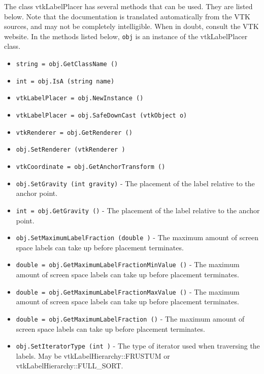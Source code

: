 The class vtkLabelPlacer has several methods that can be used.
  They are listed below.
Note that the documentation is translated automatically from the VTK sources,
and may not be completely intelligible.  When in doubt, consult the VTK website.
In the methods listed below, \verb|obj| is an instance of the vtkLabelPlacer class.
\begin{itemize}
\item  \verb|string = obj.GetClassName ()|

\item  \verb|int = obj.IsA (string name)|

\item  \verb|vtkLabelPlacer = obj.NewInstance ()|

\item  \verb|vtkLabelPlacer = obj.SafeDownCast (vtkObject o)|

\item  \verb|vtkRenderer = obj.GetRenderer ()|

\item  \verb|obj.SetRenderer (vtkRenderer )|

\item  \verb|vtkCoordinate = obj.GetAnchorTransform ()|

\item  \verb|obj.SetGravity (int gravity)| -  The placement of the label relative to the anchor point.

\item  \verb|int = obj.GetGravity ()| -  The placement of the label relative to the anchor point.

\item  \verb|obj.SetMaximumLabelFraction (double )| -  The maximum amount of screen space labels can take up before placement
 terminates.

\item  \verb|double = obj.GetMaximumLabelFractionMinValue ()| -  The maximum amount of screen space labels can take up before placement
 terminates.

\item  \verb|double = obj.GetMaximumLabelFractionMaxValue ()| -  The maximum amount of screen space labels can take up before placement
 terminates.

\item  \verb|double = obj.GetMaximumLabelFraction ()| -  The maximum amount of screen space labels can take up before placement
 terminates.

\item  \verb|obj.SetIteratorType (int )| -  The type of iterator used when traversing the labels.
 May be vtkLabelHierarchy::FRUSTUM or vtkLabelHierarchy::FULL\_SORT.


\end{itemize}
